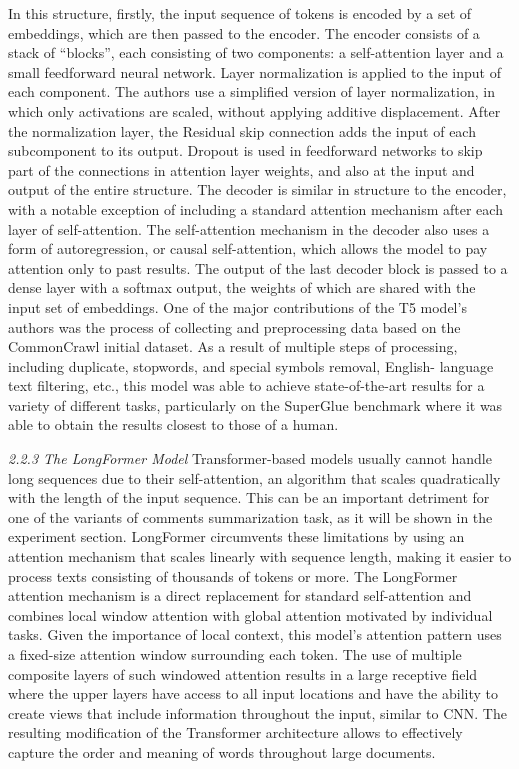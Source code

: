 In this structure, firstly, the input sequence of tokens is encoded by a set of embeddings, which are then passed to the encoder. The encoder consists of a stack of “blocks”, each consisting of two components: a self-attention layer and a small feedforward neural network. Layer normalization \cite{BaKirosHinton} is applied to the input of each component. The authors use a simplified version of layer normalization, in which only activations are scaled, without applying additive displacement. After the normalization layer, the Residual skip connection \cite{HeZhangRen} adds the input of each subcomponent to its output. Dropout \cite{SrivastavaHintonKrizhevsky} is used in feedforward networks to skip part of the connections in attention layer weights, and also at the input and output of the entire structure. The decoder is similar in structure to the encoder, with a notable exception of including a standard attention mechanism after each layer of self-attention. The self-attention mechanism in the decoder also uses a form of autoregression, or causal self-attention, which allows the model to pay attention only to past results. The output of the last decoder block is passed to a dense layer with a softmax output, the weights of which are shared with the input set of embeddings. One of the major contributions of the T5 model’s authors was the process of collecting and preprocessing data based on the CommonCrawl initial dataset. As a result of multiple steps of processing, including duplicate, stopwords, and special symbols removal, English- language text filtering, etc., this model was able to achieve state-of-the-art results for a variety of different tasks, particularly on the SuperGlue benchmark \cite{WangPruksachatkunNangia} where it was able to obtain the results closest to those of a human.

\textit{2.2.3 The LongFormer Model}
Transformer-based models usually cannot handle long sequences due to their self-attention, an algorithm that scales quadratically with the length of the input sequence. This can be an important detriment for one of the variants of comments summarization task, as it will be shown in the experiment section. LongFormer \cite{BeltagyPetersCohan} circumvents these limitations by using an attention mechanism that scales linearly with sequence length, making it easier to process texts consisting of thousands of tokens or more. The LongFormer attention mechanism is a direct replacement for standard self-attention and combines local window attention with global attention motivated by individual tasks. Given the importance of local context, this model’s attention pattern uses a fixed-size attention window surrounding each token. The use of multiple composite layers of such windowed attention results in a large receptive field where the upper layers have access to all input locations and have the ability to create views that include information throughout the input, similar to CNN. The resulting modification of the Transformer architecture allows to effectively capture the order and meaning of words throughout large documents.

